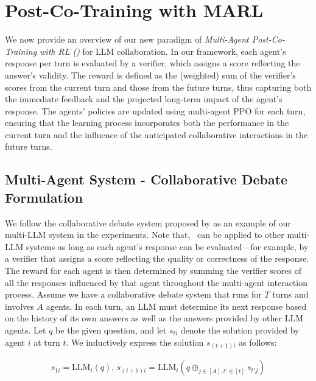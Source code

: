 \section{{Post-Co-Training} with MARL}
\label{sec:MARL}
\vspace{-2mm}
\safevspace{-2mm}
{We now provide an overview of our new paradigm of \textit{Multi-Agent Post-Co-Training with RL (\ours)} for LLM collaboration. 
In our framework, each agent's response per turn is evaluated by a verifier, which assigns a score reflecting the answer's validity. The reward 
is defined as the (weighted) sum of the verifier's scores from the current turn and those from the future turns, thus capturing both the immediate feedback and the projected long-term impact of the agent's response. The agents’ policies are updated using multi-agent PPO for each turn, ensuring that the learning process incorporates both the performance {in the current turn} and the influence of the anticipated collaborative interactions {in the future turns}.} 

\vspace{-2mm}




\subsection{Multi-Agent System - Collaborative Debate Formulation}
{We follow the collaborative debate system proposed by \citet{du2023improving}as an example of our multi-LLM system in the experiments.}  Note that, \ourstwo~can be applied to other multi-LLM systems as long as each agent’s response can be evaluated—for example, by a verifier that assigns a score reflecting the quality or correctness of the response.  The reward for each agent is then determined by summing the verifier scores of all the responses influenced by that agent throughout the {multi-agent interaction} process.
Assume we have a collaborative debate system that runs for \( T \) turns and involves \( A \) agents.  In each turn, an LLM must determine its next response based on the history of its own answers as well as the answers provided by other LLM agents. Let \( q \) be the given question, and let \( s_{ti} \) denote the solution provided by agent \( i \) at turn \( t \).  We inductively express the solution \( s_{(t+1)i} \) as follows:
\safevspace{-0.3cm}

{
\vspace{-0.5cm}
\small
\begin{align*}
s_{1i} = \text{LLM}_i\left(q\right), \,
s_{(t+1)i} = \text{LLM}_i\left(q \oplus_{j \in [A], t' \in [t]} s_{t'j}\right)  
\end{align*}}
\safevspace{-8mm}
\vspace{-0.5cm}


